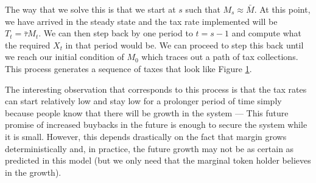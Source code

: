 The way that we solve this is that we start at $s$ such that $M_s \approx \bar{M}$. At this point,
we have arrived in the steady state and the tax rate implemented will be $T_t = \bar{\tau} M_t$. We
can then step back by one period to $t = s - 1$ and compute what the required $X_t$ in that period
would be. We can proceed to step this back until we reach our initial condition of $M_0$ which
traces out a path of tax collections. This process generates a sequence of taxes that look like
Figure \ref{fig:dg_tax_growth}.

\begin{center}
  \begin{figure}[H]
    \label{fig:dg_tax_growth}
  \end{figure}
\end{center}

The interesting observation that corresponds to this process is that the tax rates can start
relatively low and stay low for a prolonger period of time simply because people know that there
will be growth in the system --- This future promise of increased buybacks in the future is
enough to secure the system while it is small. However, this depends drastically on the fact that
margin grows deterministically and, in practice, the future growth may not be as certain as
predicted in this model (but we only need that the marginal token holder believes in the growth).
